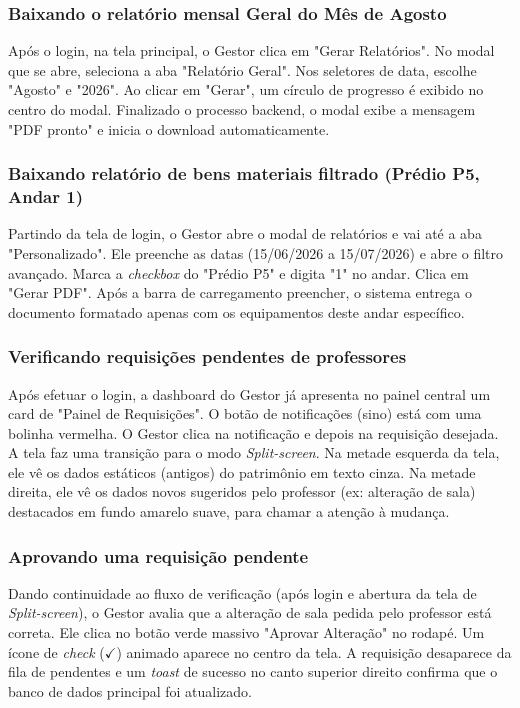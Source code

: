 \subsubsection{Baixando o relatório mensal Geral do Mês de Agosto}
Após o login, na tela principal, o Gestor clica em "Gerar Relatórios". No modal que se abre, seleciona a aba "Relatório Geral". Nos seletores de data, escolhe "Agosto" e "2026". Ao clicar em "Gerar", um círculo de progresso é exibido no centro do modal. Finalizado o processo backend, o modal exibe a mensagem "PDF pronto" e inicia o download automaticamente.

\subsubsection{Baixando relatório de bens materiais filtrado (Prédio P5, Andar 1)}
Partindo da tela de login, o Gestor abre o modal de relatórios e vai até a aba "Personalizado". Ele preenche as datas (15/06/2026 a 15/07/2026) e abre o filtro avançado. Marca a \textit{checkbox} do "Prédio P5" e digita "1" no andar. Clica em "Gerar PDF". Após a barra de carregamento preencher, o sistema entrega o documento formatado apenas com os equipamentos deste andar específico.

\subsubsection{Verificando requisições pendentes de professores}
Após efetuar o login, a dashboard do Gestor já apresenta no painel central um card de "Painel de Requisições". O botão de notificações (sino) está com uma bolinha vermelha. O Gestor clica na notificação e depois na requisição desejada. A tela faz uma transição para o modo \textit{Split-screen}. Na metade esquerda da tela, ele vê os dados estáticos (antigos) do patrimônio em texto cinza. Na metade direita, ele vê os dados novos sugeridos pelo professor (ex: alteração de sala) destacados em fundo amarelo suave, para chamar a atenção à mudança.

\subsubsection{Aprovando uma requisição pendente}
Dando continuidade ao fluxo de verificação (após login e abertura da tela de \textit{Split-screen}), o Gestor avalia que a alteração de sala pedida pelo professor está correta. Ele clica no botão verde massivo "Aprovar Alteração" no rodapé. Um ícone de \textit{check} ($\checkmark$) animado aparece no centro da tela. A requisição desaparece da fila de pendentes e um \textit{toast} de sucesso no canto superior direito confirma que o banco de dados principal foi atualizado.


